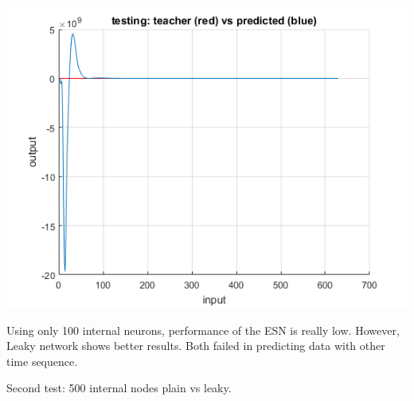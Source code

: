 \documentclass[a4paper, 12pt]{article}
\begin{document}
\begin{center}
\includegraphics[scale=0.6]{100leakyt.png}
\end{center}

Using only 100 internal neurons, performance of the ESN is really low. However, Leaky network shows better results. Both failed in predicting data with other time sequence.


Second test: 500 internal nodes plain vs leaky.
\end{document}
